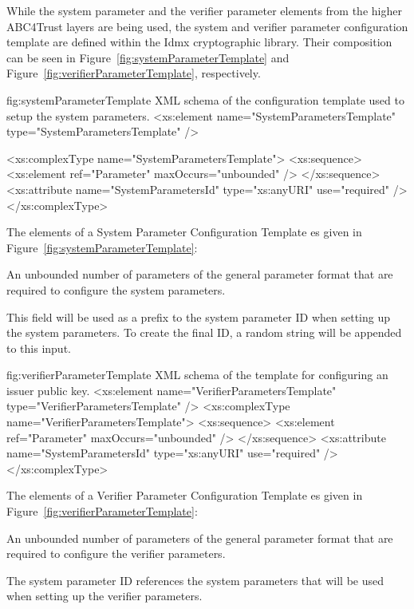 While the system parameter and the verifier parameter elements from the higher ABC4Trust layers are being used, 
the system  and verifier parameter configuration template are defined within the Idmx cryptographic library.
Their composition can be seen in Figure~\ref{fig:systemParameterTemplate} and 
Figure~\ref{fig:verifierParameterTemplate}, respectively.

\begin{xml}
{fig:systemParameterTemplate}
{XML schema of the configuration template used to setup the system parameters.}
<xs:element name="SystemParametersTemplate" type="SystemParametersTemplate" />

<xs:complexType name="SystemParametersTemplate">
  <xs:sequence>
    <xs:element ref="Parameter" maxOccurs="unbounded" />
  </xs:sequence>
  <xs:attribute name="SystemParametersId" type="xs:anyURI" use="required" />
</xs:complexType>
\end{xml}

\vspace{3pt}\noindent The elements of a System Parameter Configuration Template es given in Figure~\ref{fig:systemParameterTemplate}:
\begin{parameter}
An unbounded number of parameters of the general parameter format that are required to 
configure the system parameters.
\end{parameter}
\begin{parameter}
This field will be used as a prefix to the 
system parameter ID when setting up the system parameters. 
To create the final ID, a random string will be appended to this input.
\end{parameter}




\begin{xml}
{fig:verifierParameterTemplate}
{XML schema of the template for configuring an issuer public key.}
<xs:element name="VerifierParametersTemplate" type="VerifierParametersTemplate" />
<xs:complexType name="VerifierParametersTemplate">
  <xs:sequence>
    <xs:element ref="Parameter" maxOccurs="unbounded" />
  </xs:sequence>
  <xs:attribute name="SystemParametersId" type="xs:anyURI"
    use="required" />
</xs:complexType>
\end{xml}

\vspace{3pt}\noindent The elements of a Verifier Parameter Configuration Template es given in Figure~\ref{fig:verifierParameterTemplate}:
\begin{parameter}
An unbounded number of parameters of the general parameter format that are required to 
configure the verifier parameters.
\end{parameter}
\begin{parameter}
The system parameter ID references the system parameters that will be used when setting up the 
verifier parameters.
\end{parameter}





